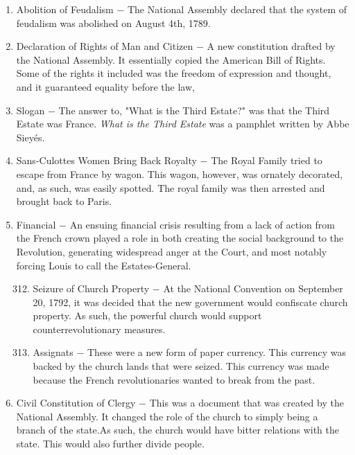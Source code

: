 \documentclass[12pt]{article}
\begin{document}
\begin{enumerate}
\item Abolition of Feudalism $-$ The National Assembly declared that the system of feudalism was abolished on August 4th, 1789.

\item Declaration of Rights of Man and Citizen $-$ A new constitution drafted by the National Assembly. It essentially copied the American Bill of Rights. Some of the rights it included was the freedom of expression and thought, and it guaranteed equality before the law,

\item Slogan $-$ The answer to, "What is the Third Estate?" was that the Third Estate was France. \textit{What is the Third Estate} was a pamphlet written by Abbe Siey\'es.

\item Sans-Culottes Women Bring Back Royalty $-$ The Royal Family tried to escape from France by wagon. This wagon, however, was ornately decorated, and, as such, was easily spotted. The royal family was then arrested and brought back to Paris.

\item Financial $-$ An ensuing financial crisis resulting from a lack of action from the French crown played a role in both creating the social background to the Revolution, generating widespread anger at the Court, and most notably forcing Louis to call the Estates-General. 


\begin{enumerate}[label=\arabic{*}.]
\setcounter{enumii}{311}

\item Seizure of Church Property $-$ At the National Convention on September 20, 1792, it was decided that the new government would confiscate church property. As such, the powerful church would support counterrevolutionary measures.

\item Assignats $-$ These were a new form of paper currency. This currency was backed by the church lands that were seized. This currency was made because the French revolutionaries wanted to break from the past.

\end{enumerate}
\setcounter{enumi}{313}

\item Civil Constitution of Clergy $-$ This was a document that was created by the National Assembly. It changed the role of the church to simply being a branch of the state.As such, the church would have bitter relations with the state. This would also further divide people.


\end{enumerate}
\end{document}
